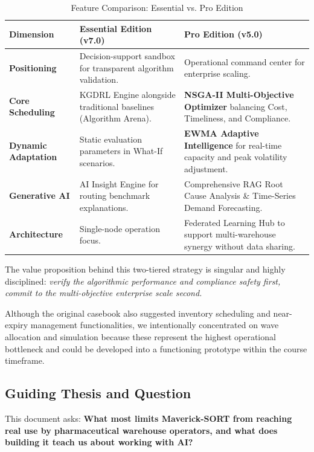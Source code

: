 \begin{table}[htbp]
\centering
\caption{Feature Comparison: Essential vs. Pro Edition}
\label{tab:edition_comparison}
\begin{tabular}{p{3.5cm} p{5.5cm} p{6.0cm}}
\hline
\textbf{Dimension} & \textbf{Essential Edition (v7.0)} & \textbf{Pro Edition (v5.0)} \\
\hline
\textbf{Positioning} & Decision-support sandbox for transparent algorithm validation. & Operational command center for enterprise scaling. \\
\textbf{Core Scheduling} & KGDRL Engine alongside traditional baselines (Algorithm Arena). & \textbf{NSGA-II Multi-Objective Optimizer} balancing Cost, Timeliness, and Compliance. \\
\textbf{Dynamic Adaptation} & Static evaluation parameters in What-If scenarios. & \textbf{EWMA Adaptive Intelligence} for real-time capacity and peak volatility adjustment. \\
\textbf{Generative AI} & AI Insight Engine for routing benchmark explanations. & Comprehensive RAG Root Cause Analysis \& Time-Series Demand Forecasting. \\
\textbf{Architecture} & Single-node operation focus. & Federated Learning Hub to support multi-warehouse synergy without data sharing. \\
\hline
\end{tabular}
\end{table}

The value proposition behind this two-tiered strategy is singular and highly disciplined: \textit{verify the algorithmic performance and compliance safety first, commit to the multi-objective enterprise scale second.}

Although the original casebook also suggested inventory scheduling and near-expiry management functionalities, we intentionally concentrated on wave allocation and simulation because these represent the highest operational bottleneck and could be developed into a functioning prototype within the course timeframe.

\subsection{Guiding Thesis and Question}

This document asks: \textbf{What most limits Maverick-SORT from reaching real use by pharmaceutical warehouse operators, and what does building it teach us about working with AI?}

